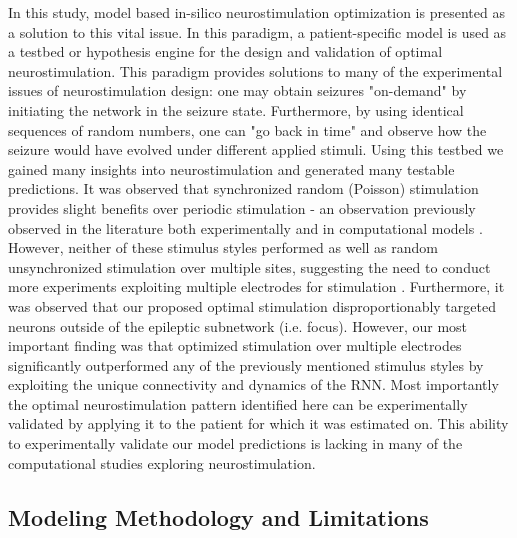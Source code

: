 \documentclass[11pt,a4paper,final]{article}
\begin{document}
In this study, model based in-silico neurostimulation optimization is presented as a solution to this vital issue.
In this paradigm, a patient-specific model is used as a testbed or hypothesis engine for the design and validation of optimal neurostimulation.
This paradigm provides solutions to many of the experimental issues of neurostimulation design: one may obtain seizures "on-demand" by initiating the network in the seizure state.
Furthermore, by using identical sequences of random numbers, one can "go back in time" and observe how the seizure would have evolved under different applied stimuli.
Using this testbed we gained many insights into neurostimulation and generated many testable predictions.
It was observed that synchronized random (Poisson) stimulation provides slight benefits over periodic stimulation - an observation previously observed in the literature both experimentally and in computational models \citep{wyckhuys10,buffel14}.
However, neither of these stimulus styles performed as well as random unsynchronized stimulation over multiple sites, suggesting the need to conduct more experiments exploiting multiple electrodes for stimulation \citep{cook13,van14}.
Furthermore, it was observed that our proposed optimal stimulation disproportionably targeted neurons outside of the epileptic subnetwork (i.e. focus).
However, our most important finding was that optimized stimulation over multiple electrodes significantly outperformed any of the previously mentioned stimulus styles by exploiting the unique connectivity and dynamics of the RNN.
Most importantly the optimal neurostimulation pattern identified here can be experimentally validated by applying it to the patient for which it was estimated on.
This ability to experimentally validate our model predictions is lacking in many of the computational studies exploring neurostimulation.

\subsection{Modeling Methodology and Limitations}
\end{document}
